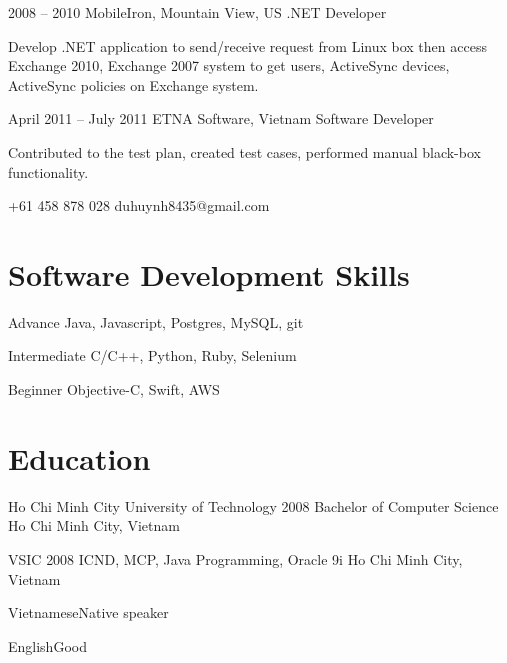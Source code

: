 \documentclass{tccv}
\begin{document}
\begin{eventlist}
\item{2008 -- 2010}
     {MobileIron, Mountain View, US}
     {.NET Developer}

Develop .NET application to send/receive request from
  Linux box then access Exchange 2010, Exchange 2007
  system to get users, ActiveSync devices, ActiveSync
  policies on Exchange system.

\item{April 2011 -- July 2011}
     {ETNA Software, Vietnam}
     {Software Developer}

Contributed to the test plan, created test cases, performed manual black-box functionality.

\end{eventlist}

    {+61 458 878 028}
    {duhuynh8435@gmail.com}
 

\section{Software Development Skills}

\begin{factlist}

\item{Advance}
     {Java, Javascript, Postgres, MySQL, git}

\item{Intermediate}
     {C/C++, Python, Ruby, Selenium}

\item{Beginner}
     {Objective-C, Swift, AWS}
\end{factlist}

\section{Education}

\begin{yearlist}

\item[Ho Chi Minh City University of Technology]{2008}
     {Bachelor of Computer Science}
     {Ho Chi Minh City, Vietnam}

\item[VSIC]{2008}
     {ICND, MCP, Java Programming, Oracle 9i}
     {Ho Chi Minh City, Vietnam}

\end{yearlist}

\begin{factlist}
\item{Vietnamese}{Native speaker}
\item{English}{Good}
\end{factlist}
\end{document}
